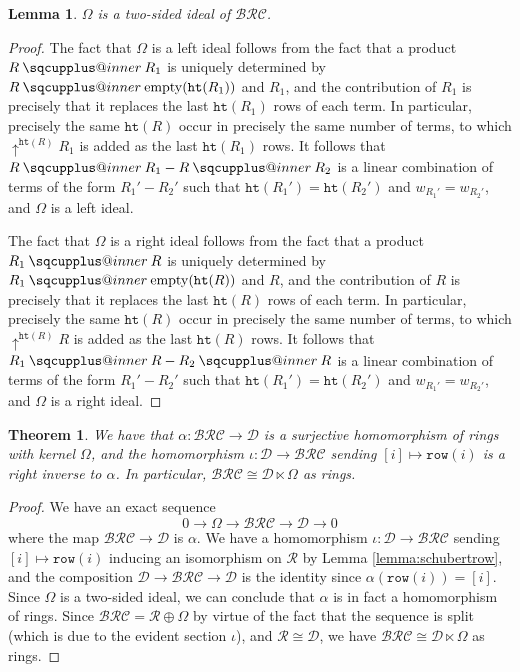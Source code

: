 \documentclass{amsart}
\makeatletter
\newcommand{\sqcupplus@inner}[2]{%
  \vcenter{\hbox{\ooalign{%
    \hfil$\m@th#1\sqcup$\hfil\cr
    \hfil\raisebox{0.15ex}{$\m@th#1\scriptscriptstyle+$}\hfil\cr
  }}}%
}
\newcommand{\sqcupplus}{\mathbin{\mathpalette\sqcupplus@inner\relax}}
\newtheorem{lemma}{Lemma}[subsection]
\newtheorem{theorem}{Theorem}[section]
\theoremstyle{definition}
\theoremstyle{remark}
\numberwithin{equation}{subsection}
\newcommand{\shup}{{\uparrow}}
\newcommand{\wof}[1]{w_{#1}}
\newcommand{\hr}{\mathtt{ht}}
\newcommand{\BRC}{\mathcal{BRC}}
\newcommand{\dcoma}{\mathcal{D}}
\makeatother
\begin{document}
\begin{lemma}
$\Omega$ is a two-sided ideal of $\BRC$.
\end{lemma}
\begin{proof}
  The fact that $\Omega$ is a left ideal follows from the fact that a product $R\sqcupplus R_1$ is uniquely determined by $R\sqcupplus \mathrm{empty}(\hr(R_1))$ and $R_1$, and the contribution of $R_1$ is precisely that it replaces the last $\hr(R_1)$ rows of each term. In particular, precisely the same $\hr(R)$ occur in precisely the same number of terms, to which $\shup^{\hr(R)}R_1$ is added as the last $\hr(R_1)$ rows. It follows that $R\sqcupplus R_1 - R\sqcupplus R_2$ is a linear combination of terms of the form $R_1' - R_2'$ such that $\hr(R_1') = \hr(R_2')$ and $\wof{R_1'} = \wof{R_2'}$, and $\Omega$ is a left ideal.

  The fact that $\Omega$ is a right ideal follows from the fact that a product $R_1\sqcupplus R$ is uniquely determined by $R_1\sqcupplus \mathrm{empty}(\hr(R))$ and $R$, and the contribution of $R$ is precisely that it replaces the last $\hr(R)$ rows of each term. In particular, precisely the same $\hr(R)$ occur in precisely the same number of terms, to which $\shup^{\hr(R)}R$ is added as the last $\hr(R)$ rows. It follows that $R_1\sqcupplus R - R_2\sqcupplus R$ is a linear combination of terms of the form $R_1' - R_2'$ such that $\hr(R_1') = \hr(R_2')$ and $\wof{R_1'} = \wof{R_2'}$, and $\Omega$ is a right ideal.
\end{proof}

\begin{theorem} \label{theorem:semidirect}
  We have that $\alpha:\BRC\to \dcoma$ is a surjective homomorphism of rings with kernel $\Omega$, and the homomorphism $\iota:\dcoma\to\BRC$ sending $[i]\mapsto \mathtt{row}(i)$ is a right inverse to $\alpha$. In particular, $\BRC\cong \dcoma\ltimes \Omega$ as rings.
\end{theorem}
\begin{proof}
  We have an exact sequence
$$0\to \Omega\to \BRC\to \dcoma\to 0$$
where the map $\BRC\to \dcoma$ is $\alpha$. We have a homomorphism $\iota:\dcoma\to \BRC$ sending $[i]\mapsto \mathtt{row}(i)$ inducing an isomorphism on $\mathcal{R}$ by Lemma \ref{lemma:schubertrow}, and the composition $\dcoma\to \BRC\to \dcoma$ is the identity since $\alpha(\mathtt{row}(i)) = [i]$. Since $\Omega$ is a two-sided ideal, we can conclude that $\alpha$ is in fact a homomorphism of rings. Since $\BRC = \mathcal{R}\oplus \Omega$ by virtue of the fact that the sequence is split (which is due to the evident section $\iota$), and $\mathcal{R}\cong \dcoma$, we have $\BRC\cong \dcoma\ltimes \Omega$ as rings.
\end{proof}
\end{document}
